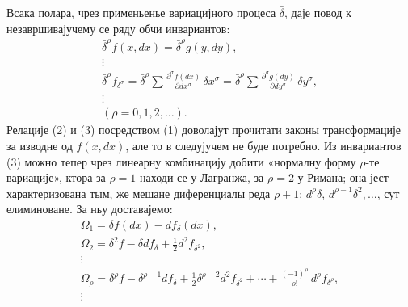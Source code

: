 ﻿\documentclass[11pt]{article}
\providecommand{\bdelta}{\bar{\delta}}
\begin{document}
Всака полара, чрез применьенье вариацијного процеса \(\bdelta\), даје повод к незавршивајучему се ряду обчи инвариантов:
\begin{equation}
\begin{gathered}
\bdelta^\rho f(x,dx)=\bdelta^\rho g(y,dy),\\
\vdots\\
\bdelta^\rho f_{\delta^\sigma}
=\bdelta^\rho\sum\frac{\partial^\sigma f(dx)}{\partial dx^\sigma}\,
\delta x^\sigma
=\bdelta^\rho\sum\frac{\partial^\sigma g(dy)}{\partial dy^\sigma}\,
\delta y^\sigma,\\
\vdots\\[0.2em]
(\rho=0,1,2,\ldots).
\end{gathered}
\tag{3}
\end{equation}
Релације (2) и (3) посредством (1) доволајут прочитати законы трансформације за изводне од \(f(x,dx)\), але то в следујучем не буде потребно. Из инвариантов (3) можно тепер чрез линеарну комбинацију добити «нормалну форму \(\rho\)-те вариације», ктора за \(\rho=1\) находи се у Лагранжа, за \(\rho=2\) у Римана; она јест характеризована тым, же мешане диференциалы реда \(\rho+1\): \(d^\rho\delta\), \(d^{\rho-1}\delta^2,\ldots\), сут елиминоване. За ньу доставајемо:
\begin{equation}
\begin{gathered}
\Omega_1=\delta f(dx)-d f_\delta(dx),\\
\Omega_2=\delta^2 f-\delta d f_\delta+\frac12 d^2 f_{\delta^2},\\
\vdots\\
\Omega_\rho=\delta^\rho f-\delta^{\rho-1}d f_\delta
+\frac12\delta^{\rho-2}d^2 f_{\delta^2}
+\cdots+\frac{(-1)^\rho}{\rho!}\,d^\rho f_{\delta^\rho},\\
\vdots
\end{gathered}
\tag{4}
\end{equation}
\end{document}
